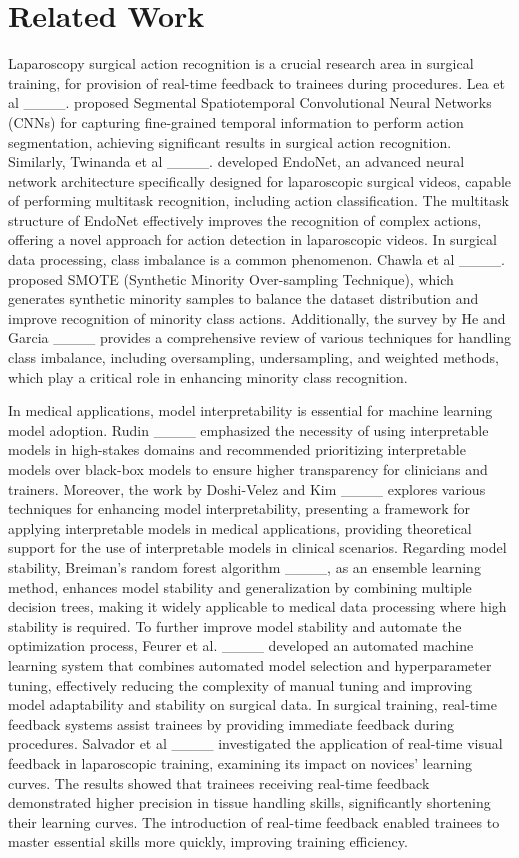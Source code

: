 \section{Related Work}
Laparoscopy surgical action recognition is a crucial research area in surgical training, for provision of real-time feedback to trainees during procedures. Lea et al ____. proposed Segmental Spatiotemporal Convolutional Neural Networks (CNNs) for capturing fine-grained temporal information to perform action segmentation, achieving significant results in surgical action recognition. Similarly, Twinanda et al ____. developed EndoNet, an advanced neural network architecture specifically designed for laparoscopic surgical videos, capable of performing multitask recognition, including action classification. The multitask structure of EndoNet effectively improves the recognition of complex actions, offering a novel approach for action detection in laparoscopic videos. In surgical data processing, class imbalance is a common phenomenon. Chawla et al ____. proposed SMOTE (Synthetic Minority Over-sampling Technique), which generates synthetic minority samples to balance the dataset distribution and improve recognition of minority class actions. Additionally, the survey by He and Garcia ____ provides a comprehensive review of various techniques for handling class imbalance, including oversampling, undersampling, and weighted methods, which play a critical role in enhancing minority class recognition.

In medical applications, model interpretability is essential for machine learning model adoption. Rudin ____ emphasized the necessity of using interpretable models in high-stakes domains and recommended prioritizing interpretable models over black-box models to ensure higher transparency for clinicians and trainers. Moreover, the work by Doshi-Velez and Kim ____ explores various techniques for enhancing model interpretability, presenting a framework for applying interpretable models in medical applications, providing theoretical support for the use of interpretable models in clinical scenarios. Regarding model stability, Breiman's random forest algorithm ____, as an ensemble learning method, enhances model stability and generalization by combining multiple decision trees, making it widely applicable to medical data processing where high stability is required. To further improve model stability and automate the optimization process, Feurer et al. ____ developed an automated machine learning system that combines automated model selection and hyperparameter tuning, effectively reducing the complexity of manual tuning and improving model adaptability and stability on surgical data. In surgical training, real-time feedback systems assist trainees by providing immediate feedback during procedures. Salvador et al ____ investigated the application of real-time visual feedback in laparoscopic training, examining its impact on novices' learning curves. The results showed that trainees receiving real-time feedback demonstrated higher precision in tissue handling skills, significantly shortening their learning curves. The introduction of real-time feedback enabled trainees to master essential skills more quickly, improving training efficiency.


